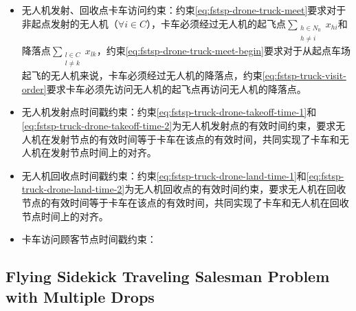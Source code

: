 \begin{itemize}
    \begin{itemize}
        \item 无人机发射、回收点卡车访问约束：约束\ref{eq:fstsp-drone-truck-meet}要求对于非起点发射的无人机（$\forall i \in C$），卡车必须经过无人机的起飞点$\sum_{\substack{h \in N_0 \\ h \neq i}}x_{hi}$和降落点$\sum_{\substack{l \in C\\ l \neq k}}x_{lk}$，约束\ref{eq:fstsp-drone-truck-meet-begin}要求对于从起点车场起飞的无人机来说，卡车必须经过无人机的降落点，约束\ref{eq:fstsp-truck-visit-order}要求卡车必须先访问无人机的起飞点再访问无人机的降落点。
        \item 无人机发射点时间戳约束：约束\ref{eq:fstsp-truck-drone-takeoff-time-1}和\ref{eq:fstsp-truck-drone-takeoff-time-2}为无人机发射点的有效时间约束，要求无人机在发射节点的有效时间等于卡车在该点的有效时间，共同实现了卡车和无人机在发射节点时间上的对齐。
        \item 无人机回收点时间戳约束：约束\ref{eq:fstsp-truck-drone-land-time-1}和\ref{eq:fstsp-truck-drone-land-time-2}为无人机回收点的有效时间约束，要求无人机在回收节点的有效时间等于卡车在该点的有效时间，共同实现了卡车和无人机在回收节点时间上的对齐。
        \item 卡车访问顾客节点时间戳约束：
    \end{itemize}
\end{itemize}


\subsection{Flying Sidekick Traveling Salesman Problem with Multiple Drops}
